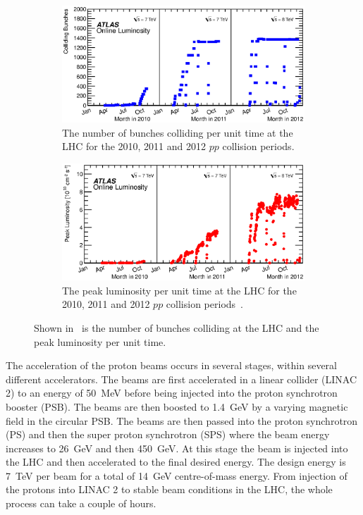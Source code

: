 \begin{figure}[htbp]
  \centering
    \begin{subfigure}[b]{0.95\textwidth}
      \includegraphics[width=\textwidth]{PartDetector/Plots/BunchesCollidingPerTime.eps}
      \caption{The number of bunches colliding per unit time at the LHC for the 2010, 2011 and 2012 $pp$ collision periods.}
      \label{fig:DetectorBunchesColliding}
    \end{subfigure}
  
    \begin{subfigure}[b]{0.95\textwidth}
      \includegraphics[width=\textwidth]{PartDetector/Plots/PeakLuminosityVsTime.eps}
      \caption{The peak luminosity per unit time at the LHC for the 2010, 2011 and 2012 $pp$ collision periods~\cite{Detector:LuminosityResults}.}
      \label{fig:DetectorPeakLumi}
    \end{subfigure}
    \caption{Shown in~ is the number of bunches colliding at the LHC and  the peak luminosity per unit time.}
  \label{fig:DetectorPerformance}
\end{figure}

The acceleration of the proton beams occurs in several stages, within several different accelerators. The beams are first accelerated in a linear collider (LINAC 2) to an energy of \SI{50}{\MeV} before being injected into the proton synchrotron booster (PSB). The beams are then boosted to \SI{1.4}{\GeV} by a varying magnetic field in the circular PSB. The beams are then passed into the proton synchrotron (PS) and then the super proton synchrotron (SPS) where the beam energy increases to \SI{26}{\GeV} and then \SI{450}{\GeV}. At this stage the beam is injected into the LHC and then accelerated to the final desired energy. The design energy is \SI{7}{\TeV} per beam for a total of \SI{14}{\GeV} centre-of-mass energy. From injection of the protons into LINAC 2 to stable beam conditions in the LHC, the whole process can take a couple of hours.

